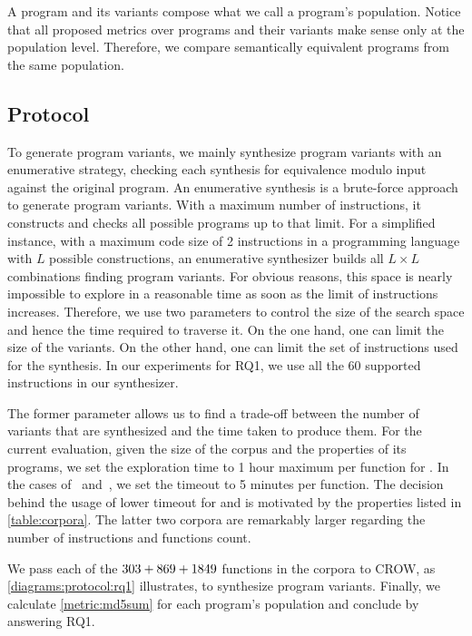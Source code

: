 A program and its variants compose what we call a program's population. Notice that all proposed metrics over programs and their variants make sense only at the population level. Therefore, we compare semantically equivalent programs from the same population.

\subsection*{Protocol}
To generate program variants, we mainly synthesize program variants with an enumerative strategy, checking each synthesis for equivalence modulo input \cite{Li2018} against the original program. An enumerative synthesis is a brute-force approach to generate program variants. With a maximum number of instructions, it constructs and checks all possible programs up to that limit. For a simplified instance, with a maximum code size of 2 instructions in a programming language with $L$ possible constructions, an enumerative synthesizer builds all $L\times L$ combinations finding program variants. For obvious reasons, this space is nearly impossible to explore in a reasonable time as soon as the limit of instructions increases.
Therefore, we use two parameters to control the size of the search space and hence the time required to traverse it.
On the one hand, one can limit the size of the variants. On the other hand, one can limit the set of instructions used for the synthesis. In our experiments for RQ1, we use all the $60$ supported instructions in our synthesizer.


The former parameter allows us to find a trade-off between the number of variants that are synthesized and the time taken to produce them. For the current evaluation, given the size of the corpus and the properties of its programs, we set the exploration time to 1 hour maximum per function for \corpusrosetta. In the cases of \corpussodium\ and\ \corpusqrcode, we set the timeout to 5 minutes per function. The decision behind the usage of lower timeout for \corpussodium
and \corpussodium is motivated by the properties listed in \autoref{table:corpora}. The latter two corpora are remarkably larger regarding the number of instructions and functions count. 

We pass each of the $303 + 869 + 1849$ functions in the corpora to CROW, as \autoref{diagrams:protocol:rq1} illustrates, to synthesize program variants. Finally, we calculate \autoref{metric:md5sum} for each program's population and conclude by answering RQ1.
